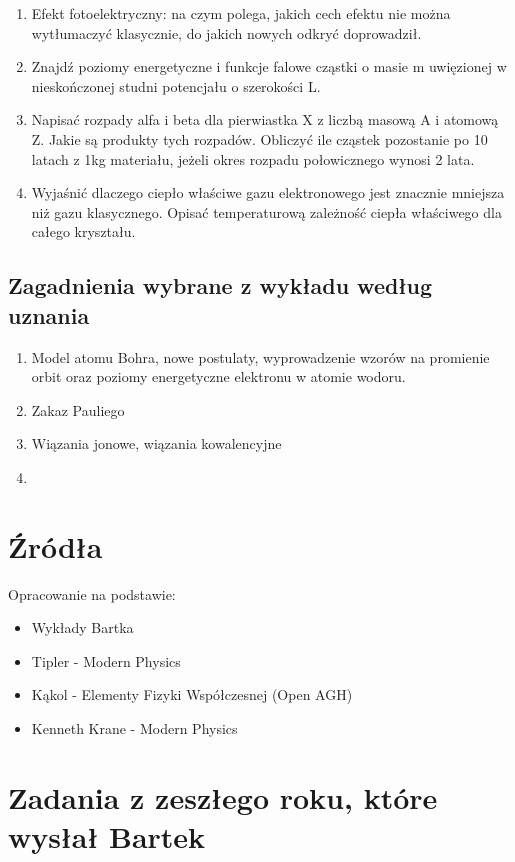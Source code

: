 \documentclass[a4paper,15pt]{article}
\begin{document}
\begin{enumerate}

\item Efekt fotoelektryczny: na czym polega, jakich cech efektu nie można wytłumaczyć klasycznie, do jakich nowych odkryć doprowadził.
\item Znajdź poziomy energetyczne i funkcje falowe cząstki o masie m uwięzionej w nieskończonej studni potencjału o szerokości L.
\item Napisać rozpady alfa i beta dla pierwiastka X z liczbą masową A i atomową Z. Jakie są produkty tych rozpadów. Obliczyć ile cząstek pozostanie po 10 latach z 1kg materiału, jeżeli okres rozpadu połowicznego wynosi 2 lata.
\item Wyjaśnić dlaczego ciepło właściwe gazu elektronowego jest znacznie mniejsza niż gazu klasycznego. Opisać temperaturową zależność ciepła właściwego dla całego kryształu.

\end{enumerate}


\subsection{Zagadnienia wybrane z wykładu według uznania}

\begin{enumerate}
\item Model atomu Bohra, nowe postulaty, wyprowadzenie wzorów na promienie orbit oraz poziomy energetyczne elektronu w atomie wodoru.
\item Zakaz Pauliego
\item Wiązania jonowe, wiązania kowalencyjne
\item 
\end{enumerate}


\section{Źródła}
Opracowanie na podstawie:
\begin{itemize}
\item Wykłady Bartka
\item Tipler - Modern Physics
\item Kąkol - Elementy Fizyki Współczesnej (Open AGH) 
\item Kenneth Krane - Modern Physics
\end{itemize}




\newpage
\section{Zadania z zeszłego roku, które wysłał Bartek}
\end{document}
